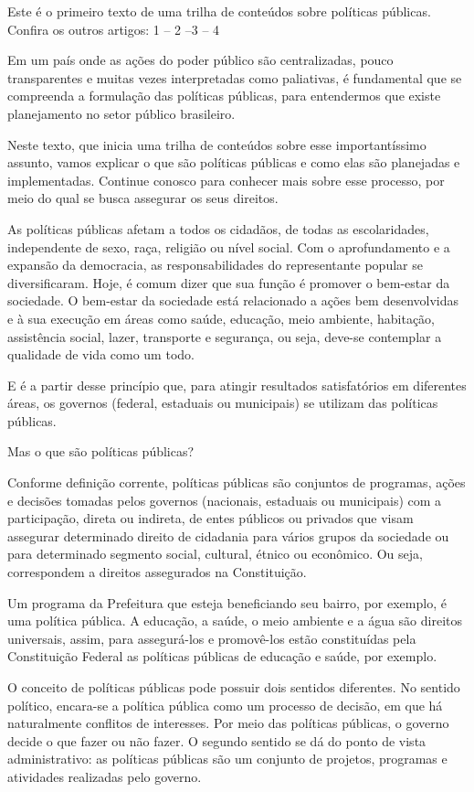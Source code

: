 \documentclass[
   article,       
   12pt,          
   oneside,       
   a4paper,       
   english,       
   brazil,        
   sumario=tradicional
   ]{abntex2}
\begin{document}
Este é o primeiro texto de uma trilha de conteúdos sobre políticas públicas. Confira os outros artigos: 1 – 2 –3 – 4

Em um país onde as ações do poder público são centralizadas, pouco transparentes e muitas vezes interpretadas como paliativas, é fundamental que se compreenda a formulação das políticas públicas, para entendermos que existe planejamento no setor público brasileiro.

Neste texto, que inicia uma trilha de conteúdos sobre esse importantíssimo assunto, vamos explicar o que são políticas públicas e como elas são planejadas e implementadas. Continue conosco para conhecer mais sobre esse processo, por meio do qual se busca assegurar os seus direitos.

As políticas públicas afetam a todos os cidadãos, de todas as escolaridades, independente de sexo, raça, religião ou nível social. Com o aprofundamento e a expansão da democracia, as responsabilidades do representante popular se diversificaram. Hoje, é comum dizer que sua função é promover o bem-estar da sociedade. O bem-estar da sociedade está relacionado a ações bem desenvolvidas e à sua execução em áreas como saúde, educação, meio ambiente, habitação, assistência social, lazer, transporte e segurança, ou seja, deve-se contemplar a qualidade de vida como um todo.

E é a partir desse princípio que, para atingir resultados satisfatórios em diferentes áreas, os governos (federal, estaduais ou municipais) se utilizam das políticas públicas.

Mas o que são políticas públicas?

Conforme definição corrente, políticas públicas são conjuntos de programas, ações e decisões tomadas pelos governos (nacionais, estaduais ou municipais) com a participação, direta ou indireta, de entes públicos ou privados que visam assegurar determinado direito de cidadania para vários grupos da sociedade ou para determinado segmento social, cultural, étnico ou econômico. Ou seja, correspondem a direitos assegurados na Constituição.

Um programa da Prefeitura que esteja beneficiando seu bairro, por exemplo, é uma política pública. A educação, a saúde, o meio ambiente e a água são direitos universais, assim, para assegurá-los e promovê-los estão constituídas pela Constituição Federal as políticas públicas de educação e saúde, por exemplo.

O conceito de políticas públicas pode possuir dois sentidos diferentes. No sentido político, encara-se a política pública como um processo de decisão, em que há naturalmente conflitos de interesses. Por meio das políticas públicas, o governo decide o que fazer ou não fazer. O segundo sentido se dá do ponto de vista administrativo: as políticas públicas são um conjunto de projetos, programas e atividades realizadas pelo governo.
\end{document}
